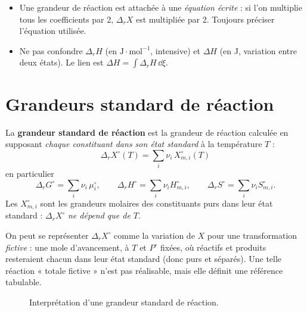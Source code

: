 \begin{pieges}
\begin{itemize}
  \item Une grandeur de réaction est attachée à une \emph{équation écrite} : si l'on multiplie tous les coefficients par 2, $\Delta_rX$ est multipliée par 2. Toujours préciser l'équation utilisée.
  \item Ne pas confondre $\Delta_rH$ (en $\mathrm{J\cdot mol^{-1}}$, intensive) et $\Delta H$ (en J, variation entre deux états). Le lien est $\Delta H = \int \Delta_rH\,\dd\xi$.
\end{itemize}
\end{pieges}

\section{Grandeurs standard de réaction}

\begin{definition}
La \textbf{grandeur standard de réaction} est la grandeur de réaction calculée en supposant \emph{chaque constituant dans son état standard} à la température $T$ :
\[ \boxed{\Delta_r X^\circ(T) = \sum_i \nu_i\,X^\circ_{m,i}(T)} \]
en particulier
\[ \Delta_rG^\circ = \sum_i\nu_i\,\mu_i^\circ,\qquad \Delta_rH^\circ = \sum_i\nu_iH^\circ_{m,i},\qquad \Delta_rS^\circ = \sum_i\nu_iS^\circ_{m,i}. \]
Les $X^\circ_{m,i}$ sont les grandeurs molaires des constituants purs dans leur état standard : $\Delta_rX^\circ$ \emph{ne dépend que de $T$}.
\end{definition}

On peut se représenter $\Delta_rX^\circ$ comme la variation de $X$ pour une transformation \emph{fictive} : une mole d'avancement, à $T$ et $P^\circ$ fixées, où réactifs et produits resteraient chacun dans leur état standard (donc purs et séparés). Une telle réaction « totale fictive » n'est pas réalisable, mais elle définit une référence tabulable.

\begin{figure}[H]
\centering
{}
\caption{Interprétation d'une grandeur standard de réaction.}
\end{figure}

